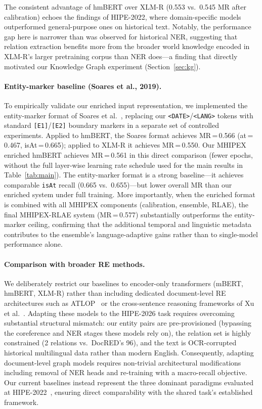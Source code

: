 \documentclass[11pt,a4paper]{article}
\begin{document}
The consistent advantage of hmBERT over XLM-R (0.553 vs.\ 0.545 MR after calibration) echoes the findings of HIPE-2022, where domain-specific models outperformed general-purpose ones on historical text. Notably, the performance gap here is narrower than was observed for historical NER, suggesting that relation extraction benefits more from the broader world knowledge encoded in XLM-R's larger pretraining corpus than NER does---a finding that directly motivated our Knowledge Graph experiment (Section~\ref{sec:kg}).

\paragraph{Entity-marker baseline (Soares et al., 2019).}
To empirically validate our enriched input representation, we implemented the entity-marker format of Soares et al.~\cite{soares2019}, replacing our \texttt{<DATE>}/\texttt{<LANG>} tokens with standard \texttt{[E1]}/\texttt{[E2]} boundary markers in a separate set of controlled experiments. Applied to hmBERT, the Soares format achieves MR\,=\,0.566 (at\,=\,0.467, isAt\,=\,0.665); applied to XLM-R it achieves MR\,=\,0.550. Our MHIPEX enriched hmBERT achieves MR\,=\,0.561 in this direct comparison (fewer epochs, without the full layer-wise learning rate schedule used for the main results in Table~\ref{tab:main}). The entity-marker format is a strong baseline---it achieves comparable \texttt{isAt} recall (0.665 vs.\ 0.655)---but lower overall MR than our enriched system under full training. More importantly, when the enriched format is combined with all MHIPEX components (calibration, ensemble, RLAE), the final MHIPEX-RLAE system (MR\,=\,0.577) substantially outperforms the entity-marker ceiling, confirming that the additional temporal and linguistic metadata contributes to the ensemble's language-adaptive gains rather than to single-model performance alone.

\paragraph{Comparison with broader RE methods.} We deliberately restrict our baselines to encoder-only transformers (mBERT, hmBERT, XLM-R) rather than including dedicated document-level RE architectures such as ATLOP~\cite{zhou2021} or the cross-sentence reasoning frameworks of Xu et al.~\cite{lyu2024}. Adapting these models to the HIPE-2026 task requires overcoming substantial structural mismatch: our entity pairs are pre-provisioned (bypassing the coreference and NER stages these models rely on), the relation set is highly constrained (2 relations vs.\ DocRED's 96), and the text is OCR-corrupted historical multilingual data rather than modern English. Consequently, adapting document-level graph models requires non-trivial architectural modifications including removal of NER heads and re-training with a macro-recall objective. Our current baselines instead represent the three dominant paradigms evaluated at HIPE-2022~\cite{schweter2022,ehrmann2022}, ensuring direct comparability with the shared task's established framework.
\end{document}
